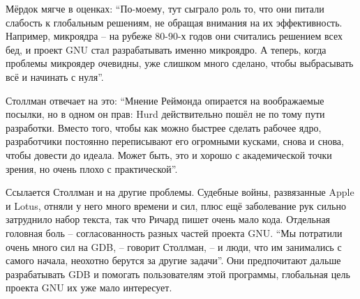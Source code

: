 Мёрдок мягче в оценках: \enquote{По-моему, тут сыграло роль то, что они питали слабость к глобальным решениям, не обращая внимания на их эффективность. Например, микроядра -- на рубеже 80-90-х годов они считались решением всех бед, и проект GNU стал разрабатывать именно микроядро. А теперь, когда проблемы микроядер очевидны, уже слишком много сделано, чтобы выбрасывать всё и начинать с нуля}.

Столлман отвечает на это: \enquote{Мнение Реймонда опирается на воображаемые посылки, но в одном он прав: Hurd действительно пошёл не по тому пути разработки. Вместо того, чтобы как можно быстрее сделать рабочее ядро, разработчики постоянно переписывают его огромными кусками, снова и снова, чтобы довести до идеала. Может быть, это и хорошо с академической точки зрения, но очень плохо с практической}.

Ссылается Столлман и на другие проблемы. Судебные войны, развязанные Apple и Lotus, отняли у него много времени и сил, плюс ещё заболевание рук сильно затруднило набор текста, так что Ричард пишет очень мало кода. Отдельная головная боль -- согласованность разных частей проекта GNU. \enquote{Мы потратили очень много сил на GDB, -- говорит Столлман, -- и люди, что им занимались с самого начала, неохотно берутся за другие задачи}. Они предпочитают дальше разрабатывать GDB и помогать пользователям этой программы, глобальная цель проекта GNU их уже мало интересует.

